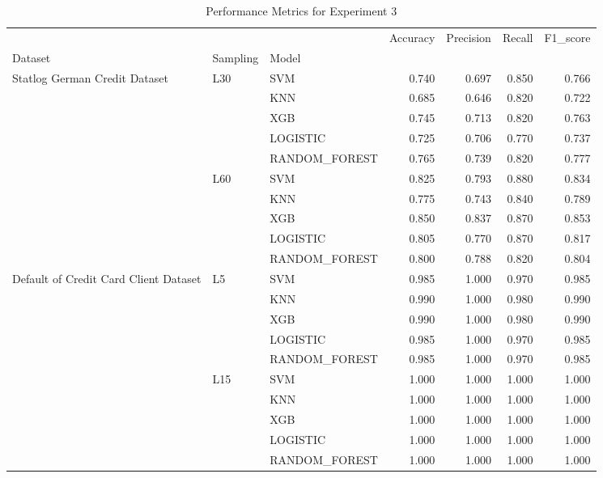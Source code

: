 \begin{table}
\caption{Performance Metrics for Experiment 3}
\label{tab:experiment_3_results}
\begin{tabular}{lllrrrr}
\toprule
 &  &  & Accuracy & Precision & Recall & F1\_score \\
Dataset & Sampling & Model &  &  &  &  \\
\midrule
\multirow[t]{10}{*}{Statlog German Credit Dataset} & \multirow[t]{5}{*}{L30} & SVM & 0.740 & 0.697 & 0.850 & 0.766 \\
 &  & KNN & 0.685 & 0.646 & 0.820 & 0.722 \\
 &  & XGB & 0.745 & 0.713 & 0.820 & 0.763 \\
 &  & LOGISTIC & 0.725 & 0.706 & 0.770 & 0.737 \\
 &  & RANDOM\_FOREST & 0.765 & 0.739 & 0.820 & 0.777 \\
\cline{2-7}
 & \multirow[t]{5}{*}{L60} & SVM & 0.825 & 0.793 & 0.880 & 0.834 \\
 &  & KNN & 0.775 & 0.743 & 0.840 & 0.789 \\
 &  & XGB & 0.850 & 0.837 & 0.870 & 0.853 \\
 &  & LOGISTIC & 0.805 & 0.770 & 0.870 & 0.817 \\
 &  & RANDOM\_FOREST & 0.800 & 0.788 & 0.820 & 0.804 \\
\cline{1-7} \cline{2-7}
\multirow[t]{10}{*}{Default of Credit Card Client Dataset} & \multirow[t]{5}{*}{L5} & SVM & 0.985 & 1.000 & 0.970 & 0.985 \\
 &  & KNN & 0.990 & 1.000 & 0.980 & 0.990 \\
 &  & XGB & 0.990 & 1.000 & 0.980 & 0.990 \\
 &  & LOGISTIC & 0.985 & 1.000 & 0.970 & 0.985 \\
 &  & RANDOM\_FOREST & 0.985 & 1.000 & 0.970 & 0.985 \\
\cline{2-7}
 & \multirow[t]{5}{*}{L15} & SVM & 1.000 & 1.000 & 1.000 & 1.000 \\
 &  & KNN & 1.000 & 1.000 & 1.000 & 1.000 \\
 &  & XGB & 1.000 & 1.000 & 1.000 & 1.000 \\
 &  & LOGISTIC & 1.000 & 1.000 & 1.000 & 1.000 \\
 &  & RANDOM\_FOREST & 1.000 & 1.000 & 1.000 & 1.000 \\
\cline{1-7} \cline{2-7}
\bottomrule
\end{tabular}
\end{table}
